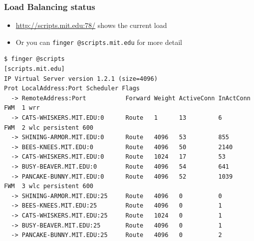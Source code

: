\begin{frame}[fragile]
  \frametitle{Load Balancing status}
  \begin{itemize}
  \item \url{http://scripts.mit.edu:78/} shows the current load
  \item Or you can \texttt{finger @scripts.mit.edu} for more detail
  \end{itemize}
  \begin{tiny}
\begin{verbatim}
$ finger @scripts
[scripts.mit.edu]
IP Virtual Server version 1.2.1 (size=4096)
Prot LocalAddress:Port Scheduler Flags
  -> RemoteAddress:Port           Forward Weight ActiveConn InActConn
FWM  1 wrr
  -> CATS-WHISKERS.MIT.EDU:0      Route   1      13         6
FWM  2 wlc persistent 600
  -> SHINING-ARMOR.MIT.EDU:0      Route   4096   53         855
  -> BEES-KNEES.MIT.EDU:0         Route   4096   50         2140
  -> CATS-WHISKERS.MIT.EDU:0      Route   1024   17         53
  -> BUSY-BEAVER.MIT.EDU:0        Route   4096   54         641
  -> PANCAKE-BUNNY.MIT.EDU:0      Route   4096   52         1039
FWM  3 wlc persistent 600
  -> SHINING-ARMOR.MIT.EDU:25     Route   4096   0          0
  -> BEES-KNEES.MIT.EDU:25        Route   4096   0          1
  -> CATS-WHISKERS.MIT.EDU:25     Route   1024   0          1
  -> BUSY-BEAVER.MIT.EDU:25       Route   4096   0          1
  -> PANCAKE-BUNNY.MIT.EDU:25     Route   4096   0          2
\end{verbatim}
  \end{tiny}
\end{frame}
